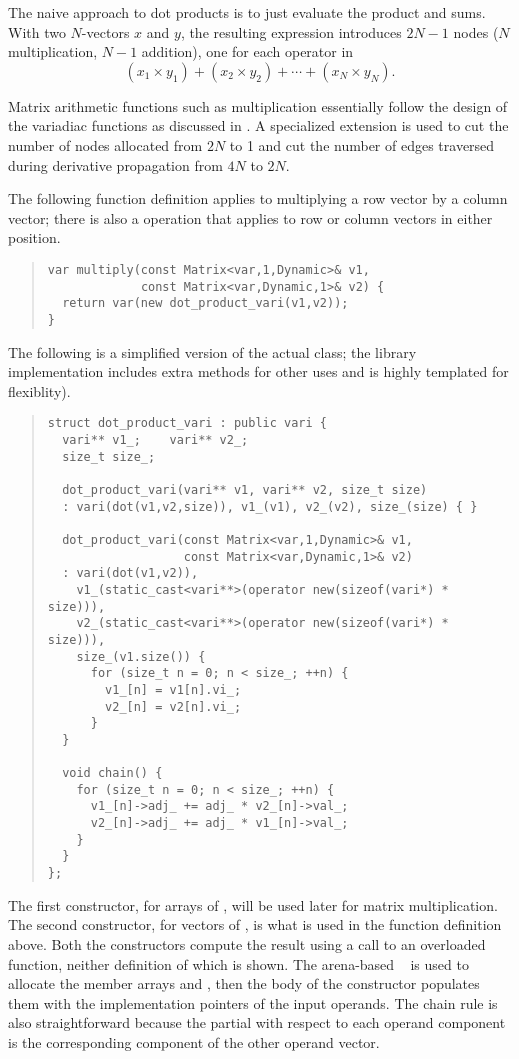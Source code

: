 \documentclass[10pt]{article}
\begin{document}
The naive approach to dot products is to just evaluate the product and
sums.  With two $N$-vectors $x$ and $y$, the resulting expression
introduces $2N - 1$ nodes ($N$ multiplication, $N-1$ addition), one
for each operator in
\[
\left( x_1 \times y_1 \right)
+ \left( x_2 \times y_2 \right) 
+ \cdots +
\left( x_N \times y_N \right).
\]

Matrix arithmetic functions such as multiplication essentially follow
the design of the variadiac functions as discussed in
.   A specialized  extension
is used to cut the number of nodes allocated from $2N$ to 1 and cut the
number of edges traversed during derivative propagation from $4N$ to $2N$.  

The following function definition applies to multiplying a row vector
by a column vector;  there is also a  operation
that applies to row or column vectors in either position.
%
\begin{quote}
\begin{Verbatim}
var multiply(const Matrix<var,1,Dynamic>& v1,
             const Matrix<var,Dynamic,1>& v2) {
  return var(new dot_product_vari(v1,v2));
}
\end{Verbatim}
\end{quote}
%
The following is a simplified version of the actual
 class; the library implementation includes
extra methods for other uses and is highly templated for flexiblity).
%
\begin{quote}
\begin{Verbatim}
struct dot_product_vari : public vari {
  vari** v1_;    vari** v2_;
  size_t size_;
  
  dot_product_vari(vari** v1, vari** v2, size_t size) 
  : vari(dot(v1,v2,size)), v1_(v1), v2_(v2), size_(size) { }

  dot_product_vari(const Matrix<var,1,Dynamic>& v1,
                   const Matrix<var,Dynamic,1>& v2)
  : vari(dot(v1,v2)),
    v1_(static_cast<vari**>(operator new(sizeof(vari*) * size))),
    v2_(static_cast<vari**>(operator new(sizeof(vari*) * size))),
    size_(v1.size()) {
      for (size_t n = 0; n < size_; ++n) {
        v1_[n] = v1[n].vi_;  
        v2_[n] = v2[n].vi_;
      }
  }

  void chain() {
    for (size_t n = 0; n < size_; ++n) {
      v1_[n]->adj_ += adj_ * v2_[n]->val_;
      v2_[n]->adj_ += adj_ * v1_[n]->val_;
    }
  }
};
\end{Verbatim}
\end{quote}
%
The first constructor, for arrays of , will be used later
for matrix multiplication.  The second constructor, for vectors of
, is what is used in the function definition above.  Both
the constructors compute the result using a call to an overloaded
function, neither definition of which is shown.  The arena-based
~ is used to allocate the member arrays
 and , then the body of the constructor
populates them with the implementation pointers of the input operands.
The chain rule is also straightforward because the partial with
respect to each operand component is the corresponding component of
the other operand vector.
\end{document}
